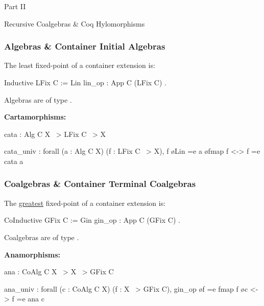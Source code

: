 \begin{frame}
  \vfill
  \centering
  \begin{sticky}
    {\normalfont Part II}

    {\normalfont\Large Recursive Coalgebras \& Coq Hylomorphisms}
    \par%
  \end{sticky}
  \vfill
\end{frame}

\begin{frame}[fragile]
  \frametitle{Algebras \& Container Initial Algebras}

  The least fixed-point of a container extension  is:
  \begin{coqcode}
    Inductive LFix C := Lin { lin_op : App C (LFix C) }.
  \end{coqcode}
  \vspace{.4cm}

  Algebras are of type .
  \vspace{.4cm}

  \textbf{Cartamorphisms:}
  \begin{coqcode}
cata : Alg C X ~> LFix C ~> X

cata_univ : forall (a : Alg C X) (f : LFix C ~> X),
  f \o Lin =e a \o fmap f <-> f =e cata a
  \end{coqcode}
\end{frame}

\begin{frame}[fragile]
  \frametitle{Coalgebras \& Container Terminal Coalgebras}

  The \ul{greatest} fixed-point of a container extension  is:
  \begin{coqcode}
    CoInductive GFix C := Gin { gin_op : App C (GFix C) }.
  \end{coqcode}
  \vspace{.4cm}

  Coalgebras are of type .
  \vspace{.4cm}

  \textbf{Anamorphisms:}
  \begin{coqcode}
ana : CoAlg C X ~> X ~> GFix C

ana_univ : forall (c : CoAlg C X) (f : X ~> GFix C),
  gin_op \o f =e fmap f \o c <-> f =e ana c
  \end{coqcode}
\end{frame}

